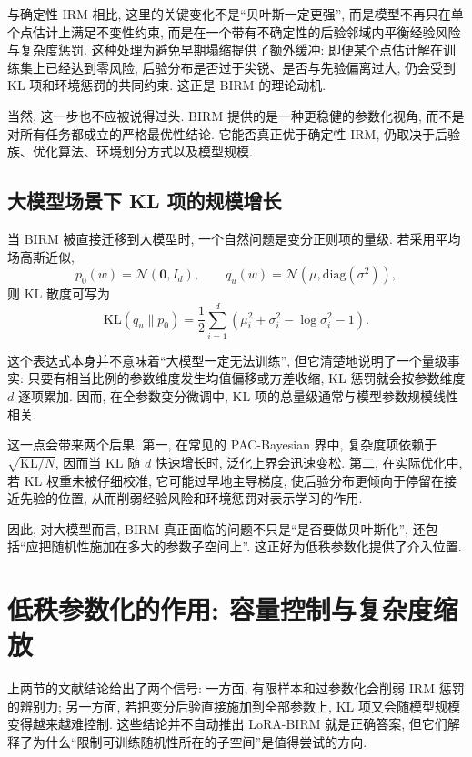 \documentclass[a4paper,punct=banjiao,twoside]{ctexrep}
\theoremstyle{plain}
\theoremstyle{definition}
\theoremstyle{remark}
\begin{document}
与确定性 IRM 相比, 这里的关键变化不是“贝叶斯一定更强”, 而是模型不再只在单个点估计上满足不变性约束, 而是在一个带有不确定性的后验邻域内平衡经验风险与复杂度惩罚. 这种处理为避免早期塌缩提供了额外缓冲: 即便某个点估计解在训练集上已经达到零风险, 后验分布是否过于尖锐、是否与先验偏离过大, 仍会受到 KL 项和环境惩罚的共同约束. 这正是 BIRM 的理论动机.

当然, 这一步也不应被说得过头. BIRM 提供的是一种更稳健的参数化视角, 而不是对所有任务都成立的严格最优性结论. 它能否真正优于确定性 IRM, 仍取决于后验族、优化算法、环境划分方式以及模型规模.

\subsection{大模型场景下 KL 项的规模增长}

当 BIRM 被直接迁移到大模型时, 一个自然问题是变分正则项的量级. 若采用平均场高斯近似,
\begin{equation}
    p_0(w)=\mathcal{N}(\mathbf{0}, I_d), \qquad q_u(w)=\mathcal{N}(\mu,\text{diag}(\sigma^2)),
\end{equation}
则 KL 散度可写为
\begin{equation}
    \text{KL}(q_u\|p_0) = \frac{1}{2}\sum_{i=1}^{d}\left(\mu_i^2 + \sigma_i^2 - \log \sigma_i^2 - 1\right).
\end{equation}

这个表达式本身并不意味着“大模型一定无法训练”, 但它清楚地说明了一个量级事实: 只要有相当比例的参数维度发生均值偏移或方差收缩, KL 惩罚就会按参数维度 $d$ 逐项累加. 因而, 在全参数变分微调中, KL 项的总量级通常与模型参数规模线性相关.

这一点会带来两个后果. 第一, 在常见的 PAC-Bayesian 界中, 复杂度项依赖于 $\sqrt{\text{KL}/N}$, 因而当 KL 随 $d$ 快速增长时, 泛化上界会迅速变松. 第二, 在实际优化中, 若 KL 权重未被仔细校准, 它可能过早地主导梯度, 使后验分布更倾向于停留在接近先验的位置, 从而削弱经验风险和环境惩罚对表示学习的作用.

因此, 对大模型而言, BIRM 真正面临的问题不只是“是否要做贝叶斯化”, 还包括“应把随机性施加在多大的参数子空间上”. 这正好为低秩参数化提供了介入位置.

\section{低秩参数化的作用: 容量控制与复杂度缩放}

上两节的文献结论给出了两个信号: 一方面, 有限样本和过参数化会削弱 IRM 惩罚的辨别力; 另一方面, 若把变分后验直接施加到全部参数上, KL 项又会随模型规模变得越来越难控制. 这些结论并不自动推出 LoRA-BIRM 就是正确答案, 但它们解释了为什么“限制可训练随机性所在的子空间”是值得尝试的方向.
\end{document}
